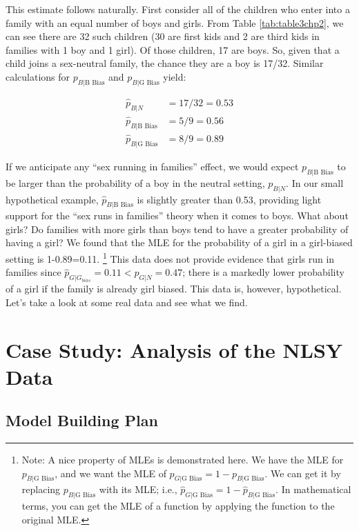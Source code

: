 \documentclass[
]{krantz}
\newcommand{\neutral}{p_{B|N}}
\newcommand{\gbias}{p_{B|\textrm{G Bias}}}
\newcommand{\bbias}{p_{B|\textrm{B Bias}}}
\begin{document}
This estimate follows naturally. First consider all of the children who enter into a family with an equal number of boys and girls. From Table \ref{tab:table3chp2}, we can see there are 32 such children (30 are first kids and 2 are third kids in families with 1 boy and 1 girl). Of those children, 17 are boys. So, given that a child joins a sex-neutral family, the chance they are a boy is 17/32. Similar calculations for \(\bbias\) and \(\gbias\) yield:

\begin{align*}
 \hat{p}_{B|N} &= 17/32 = 0.53  \\  
 \hat{p}_{B|\textrm{B Bias}} &= 5/9 = 0.56  \\
 \hat{p}_{B|\textrm{G Bias}} &= 8/9 = 0.89  
\end{align*}

If we anticipate any ``sex running in families'' effect, we would expect \(p_{B|\textrm{B Bias}}\) to be larger than the probability of a boy in the neutral setting, \(\neutral\). In our small hypothetical example, \(\hat{p}_{B|\textrm{B Bias}}\) is slightly greater than 0.53, providing light support for the ``sex runs in families'' theory when it comes to boys. What about girls? Do families with more girls than boys tend to have a greater probability of having a girl? We found that the MLE for the probability of a girl in a girl-biased setting is 1-0.89=0.11. \footnote{Note: A nice property of MLEs is demonstrated here. We have the MLE for \(\gbias\), and we want the MLE of \(p_{G|\textrm{G Bias}}=1-\gbias\). We can get it by replacing \(\gbias\) with its MLE; i.e., \(\hat{p}_{G|\textrm{G Bias}}=1-\hat{p}_{B|\textrm{G Bias}}\). In mathematical terms, you can get the MLE of a function by applying the function to the original MLE.} This data does not provide evidence that girls run in families since \(\hat{p}_{G|G_{bias}} = 0.11 < \hat{p}_{G|N}=0.47\); there is a markedly lower probability of a girl if the family is already girl biased. This data is, however, hypothetical. Let's take a look at some real data and see what we find.

\section{Case Study: Analysis of the NLSY Data}\label{case-study-analysis-of-the-nlsy-data}

\subsection{Model Building Plan}\label{model-building-plan}
\end{document}
